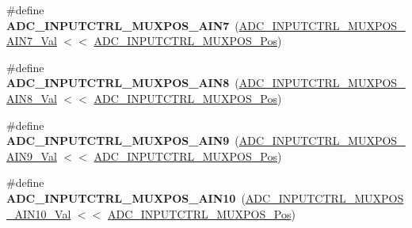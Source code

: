 \begin{DoxyCompactItemize}
\item 
\hypertarget{group___s_a_m_l21___a_d_c_gacb853c521c52e6ca07327cb667aabb64}{}\#define {\bfseries A\+D\+C\+\_\+\+I\+N\+P\+U\+T\+C\+T\+R\+L\+\_\+\+M\+U\+X\+P\+O\+S\+\_\+\+A\+I\+N7}~(\hyperlink{group___s_a_m_l21___a_d_c_ga225a4cbb07c063427f5b635c1db6655a}{A\+D\+C\+\_\+\+I\+N\+P\+U\+T\+C\+T\+R\+L\+\_\+\+M\+U\+X\+P\+O\+S\+\_\+\+A\+I\+N7\+\_\+\+Val} $<$$<$ \hyperlink{group___s_a_m_l21___a_d_c_ga583868be285e1c06c9a93dfd552d8c6a}{A\+D\+C\+\_\+\+I\+N\+P\+U\+T\+C\+T\+R\+L\+\_\+\+M\+U\+X\+P\+O\+S\+\_\+\+Pos})\label{group___s_a_m_l21___a_d_c_gacb853c521c52e6ca07327cb667aabb64}

\item 
\hypertarget{group___s_a_m_l21___a_d_c_gaf7e2abb62068d919c3c7e50fde52b492}{}\#define {\bfseries A\+D\+C\+\_\+\+I\+N\+P\+U\+T\+C\+T\+R\+L\+\_\+\+M\+U\+X\+P\+O\+S\+\_\+\+A\+I\+N8}~(\hyperlink{group___s_a_m_l21___a_d_c_ga2aee985fdfcb864f7d18c60c09c352e8}{A\+D\+C\+\_\+\+I\+N\+P\+U\+T\+C\+T\+R\+L\+\_\+\+M\+U\+X\+P\+O\+S\+\_\+\+A\+I\+N8\+\_\+\+Val} $<$$<$ \hyperlink{group___s_a_m_l21___a_d_c_ga583868be285e1c06c9a93dfd552d8c6a}{A\+D\+C\+\_\+\+I\+N\+P\+U\+T\+C\+T\+R\+L\+\_\+\+M\+U\+X\+P\+O\+S\+\_\+\+Pos})\label{group___s_a_m_l21___a_d_c_gaf7e2abb62068d919c3c7e50fde52b492}

\item 
\hypertarget{group___s_a_m_l21___a_d_c_gaec8cd0d19251492023d1ed7f2f47123a}{}\#define {\bfseries A\+D\+C\+\_\+\+I\+N\+P\+U\+T\+C\+T\+R\+L\+\_\+\+M\+U\+X\+P\+O\+S\+\_\+\+A\+I\+N9}~(\hyperlink{group___s_a_m_l21___a_d_c_ga6ca797b644abff9b69cfa7b34f6129e6}{A\+D\+C\+\_\+\+I\+N\+P\+U\+T\+C\+T\+R\+L\+\_\+\+M\+U\+X\+P\+O\+S\+\_\+\+A\+I\+N9\+\_\+\+Val} $<$$<$ \hyperlink{group___s_a_m_l21___a_d_c_ga583868be285e1c06c9a93dfd552d8c6a}{A\+D\+C\+\_\+\+I\+N\+P\+U\+T\+C\+T\+R\+L\+\_\+\+M\+U\+X\+P\+O\+S\+\_\+\+Pos})\label{group___s_a_m_l21___a_d_c_gaec8cd0d19251492023d1ed7f2f47123a}

\item 
\hypertarget{group___s_a_m_l21___a_d_c_ga5ff74e3aeaa510bd24022e8e6bd9ad3e}{}\#define {\bfseries A\+D\+C\+\_\+\+I\+N\+P\+U\+T\+C\+T\+R\+L\+\_\+\+M\+U\+X\+P\+O\+S\+\_\+\+A\+I\+N10}~(\hyperlink{group___s_a_m_l21___a_d_c_gab884f040492006360c328164cfae72a3}{A\+D\+C\+\_\+\+I\+N\+P\+U\+T\+C\+T\+R\+L\+\_\+\+M\+U\+X\+P\+O\+S\+\_\+\+A\+I\+N10\+\_\+\+Val} $<$$<$ \hyperlink{group___s_a_m_l21___a_d_c_ga583868be285e1c06c9a93dfd552d8c6a}{A\+D\+C\+\_\+\+I\+N\+P\+U\+T\+C\+T\+R\+L\+\_\+\+M\+U\+X\+P\+O\+S\+\_\+\+Pos})\label{group___s_a_m_l21___a_d_c_ga5ff74e3aeaa510bd24022e8e6bd9ad3e}


\end{DoxyCompactItemize}
